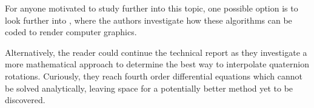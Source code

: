 \documentclass[a4paper, 11pt]{article}
\begin{document}
For anyone motivated to study further into this topic, one possible option is to look further into \citet{dunn_parberry_2002}, where the authors investigate how these algorithms can be coded to render computer graphics.

Alternatively, the reader could continue the technical report \citet{dam_koch_lillholm_1998} as they investigate a more mathematical approach to determine the best way to interpolate quaternion rotations. Curiously, they reach fourth order differential equations which cannot be solved analytically, leaving space for a potentially better method yet to be discovered. 

\newpage
\nocite{*}

\end{document}

